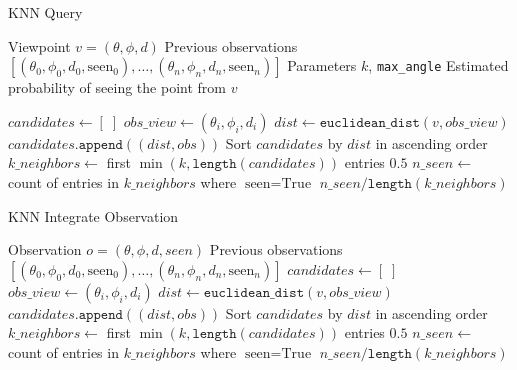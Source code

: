 \begin{singlespace}
    \begin{algorithm}[H]
        \caption{KNN Query}
        \label{alg:knn_query}
        \begin{algorithmic}
            \Require Viewpoint $v = (\theta, \phi, d)$
            \Require Previous observations $[(\theta_0, \phi_0, d_0, \text{seen}_0),\dots,(\theta_n, \phi_n, d_n, \text{seen}_n)]$
            \Require Parameters $k$, \texttt{max\_angle}
            \Ensure Estimated probability of seeing the point from $v$

            \State $candidates \gets [\;]$
            \State $obs\_view \gets (\theta_i, \phi_i, d_i)$
            \State $dist \gets \texttt{euclidean\_dist}(v, obs\_view)$
            \State $candidates.\texttt{append}((dist, obs))$
            \EndIf
            \EndFor
            \State Sort $candidates$ by $dist$ in ascending order
            \State $k\_neighbors \gets$ first $\min(k, \texttt{length}(candidates))$ entries
            \State \Return $0.5$
            \EndIf
            \State $n\_seen \gets$ count of entries in $k\_neighbors$ where $\text{seen} = \text{True}$
            \State \Return $n\_seen / \texttt{length}(k\_neighbors)$
        \end{algorithmic}
    \end{algorithm}
\end{singlespace}

\begin{singlespace}
    \begin{algorithm}[H]
        \caption{KNN Integrate Observation}
        \label{alg:knn_integrate}
        \begin{algorithmic}
            \Require Observation $o = (\theta, \phi, d, seen)$
            \Require Previous observations $[(\theta_0, \phi_0, d_0, \text{seen}_0),\dots,(\theta_n, \phi_n, d_n, \text{seen}_n)]$
            \EndIf
            \State $candidates \gets [\;]$
            \State $obs\_view \gets (\theta_i, \phi_i, d_i)$
            \State $dist \gets \texttt{euclidean\_dist}(v, obs\_view)$
            \State $candidates.\texttt{append}((dist, obs))$
            \EndIf
            \EndFor
            \State Sort $candidates$ by $dist$ in ascending order
            \State $k\_neighbors \gets$ first $\min(k, \texttt{length}(candidates))$ entries
            \State \Return $0.5$
            \EndIf
            \State $n\_seen \gets$ count of entries in $k\_neighbors$ where $\text{seen} = \text{True}$
            \State \Return $n\_seen / \texttt{length}(k\_neighbors)$
        \end{algorithmic}
    \end{algorithm}
\end{singlespace}

